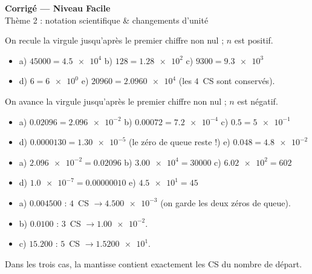 \documentclass[11pt,a4paper]{article}
\begin{document}
\begin{center}
{\Large\bfseries\color{primarydark} Corrigé — Niveau Facile}\\[1pt]
{\color{primary} Thème 2 : notation scientifique \& changements d'unité}
\end{center}
\vspace{2mm}

\begin{cor}
On recule la virgule jusqu'après le premier chiffre non nul ; $n$ est positif.
\begin{itemize}[leftmargin=1.6em,itemsep=1pt]
  \item a) $\num{45000}=\num{4,5e4}$ \quad b) $\num{128}=\num{1,28e2}$ \quad c) $\num{9300}=\num{9,3e3}$
  \item d) $\num{6}=\num{6e0}$ \quad e) $\num{20960}=\num{2,0960e4}$ (les $4$~CS sont conservés).
\end{itemize}
\end{cor}

\begin{cor}
On avance la virgule jusqu'après le premier chiffre non nul ; $n$ est négatif.
\begin{itemize}[leftmargin=1.6em,itemsep=1pt]
  \item a) $\num{0,02096}=\num{2,096e-2}$ \quad b) $\num{0,00072}=\num{7,2e-4}$ \quad c) $\num{0,5}=\num{5e-1}$
  \item d) $\num{0,0000130}=\num{1,30e-5}$ (le zéro de queue reste !) \quad e) $\num{0,048}=\num{4,8e-2}$
\end{itemize}
\end{cor}

\begin{cor}
\begin{itemize}[leftmargin=1.6em,itemsep=1pt]
  \item a) $\num{2,096e-2}=\num{0,02096}$ \quad b) $\num{3,00e4}=\num{30000}$ \quad c) $\num{6,02e2}=\num{602}$
  \item d) $\num{1,0e-7}=\num{0,00000010}$ \quad e) $\num{4,5e1}=\num{45}$
\end{itemize}
\end{cor}

\begin{cor}
\begin{itemize}[leftmargin=1.6em,itemsep=1pt]
  \item a) $\num{0,004500}$ : $4$~CS $\rightarrow \num{4,500e-3}$ (on garde les deux zéros de queue).
  \item b) $\num{0,0100}$ : $3$~CS $\rightarrow \num{1,00e-2}$.
  \item c) $\num{15,200}$ : $5$~CS $\rightarrow \num{1,5200e1}$.
\end{itemize}
Dans les trois cas, la mantisse contient exactement les CS du nombre de départ.
\end{cor}
\end{document}
